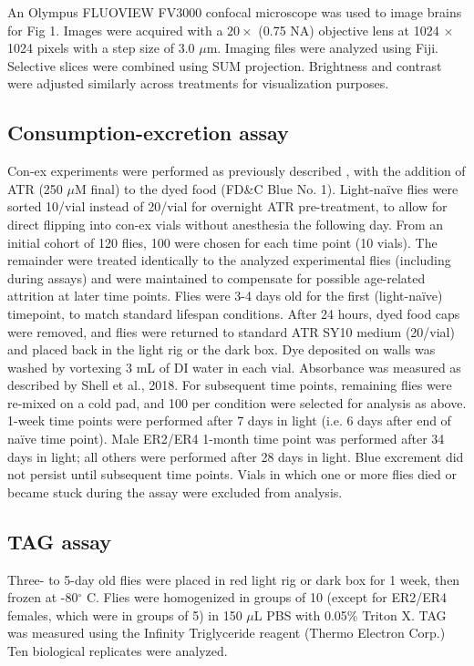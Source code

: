 An Olympus FLUOVIEW FV3000 confocal microscope was used to image brains for Fig 1. 
Images were acquired with a $20\times$ (0.75 NA) objective lens at 1024 $\times$ 1024 pixels with a step size of 3.0 $\mu$m. 
Imaging files were analyzed using Fiji. 
Selective slices were combined using SUM projection. 
Brightness and contrast were adjusted similarly across treatments for visualization purposes.


\subsection*{Consumption-excretion assay}

Con-ex experiments were performed as previously described \citep{shell2018}, with the addition of ATR (250 $\mu$M final) to the dyed food (FD\&C Blue No. 1).
Light-naïve flies were sorted 10/vial instead of 20/vial for overnight ATR pre-treatment, to allow for direct flipping into con-ex vials without anesthesia the following day. 
From an initial cohort of 120 flies, 100 were chosen for each time point (10 vials). 
The remainder were treated identically to the analyzed experimental flies (including during assays) and were maintained to compensate for possible age-related attrition at later time points.
Flies were 3-4 days old for the first (light-naïve) timepoint, to match standard lifespan conditions.
After 24 hours, dyed food caps were removed, and flies were returned to standard ATR SY10 medium (20/vial) and placed back in the light rig or the dark box.
Dye deposited on walls was washed by vortexing 3 mL of DI water in each vial. 
Absorbance was measured as described by Shell et al., 2018. 
For subsequent time points, remaining flies were re-mixed on a cold pad, and 100 per condition were selected for analysis as above.
1-week time points were performed after 7 days in light (i.e. 6 days after end of naïve time point). 
Male ER2/ER4 1-month time point was performed after 34 days in light; all others were performed after 28 days in light. 
Blue excrement did not persist until subsequent time points. 
Vials in which one or more flies died or became stuck during the assay were excluded from analysis.

\subsection*{TAG assay}

Three- to 5-day old flies were placed in red light rig or dark box for 1 week, then frozen at -80$^{\circ}$ C. 
Flies were homogenized in groups of 10 (except for ER2/ER4 females, which were in groups of 5) in 150 $\mu$L PBS with 0.05\% Triton X. 
TAG was measured using the Infinity Triglyceride reagent (Thermo Electron Corp.) 
Ten biological replicates were analyzed. 

